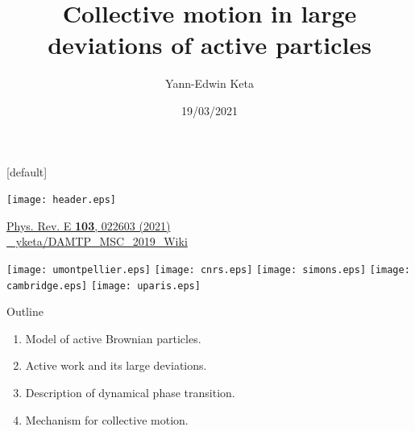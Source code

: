 \documentclass{beamer}
\title{Collective motion in large deviations of active particles}
\author{Yann-Edwin Keta}
\date{19/03/2021}
\begin{document}

{
\makeatletter
    [default]
    \def\beamer@entrycode{\vspace*{-\headheight}}
\begin{frame}[noframenumbering]

\vspace*{-4mm}
{
 \hspace*{-\beamerleftmargin}%
\begin{minipage}{\paperwidth}
\texttt{[image: header.eps]}
\end{minipage}
}

\titlepage

\vspace{-11.5pt}
\begin{center}
{\href{https://doi.org/10.1103/PhysRevE.103.022603}{Phys. Rev. E \textbf{103}, 022603 (2021)}}\\
\href{https://github.com/yketa/DAMTP_MSC_2019_Wiki}{\footnotesize \faGithub~ yketa/DAMTP\_MSC\_2019\_Wiki}
\end{center}

\vspace{-1pt}
\begin{center}
\begin{minipage}[c]{0.70\linewidth}
\texttt{[image: umontpellier.eps]}
\hfill
\texttt{[image: cnrs.eps]}
\hfill
\texttt{[image: simons.eps]}
\hfill
\texttt{[image: cambridge.eps]}
\hfill
\texttt{[image: uparis.eps]}
\end{minipage}
\end{center}

\end{frame}

}

{
\footerwithoutframenumber
\begin{frame}[noframenumbering]{Outline}

\begin{enumerate}
  \item Model of active Brownian particles.\\
  \return
  \item Active work and its large deviations.\\
  \return
  \item Description of dynamical phase transition.\\
  \return
  \item Mechanism for collective motion.
\end{enumerate}

\end{frame}
}
\end{document}

